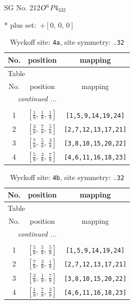 \documentclass[fleqn,8pt]{jsarticle}
\begin{document}
\setcounter{MaxMatrixCols}{32}

\renewcommand{\tablename}{Table~}
\renewcommand{\figurename}{Figure~}
\begin{center}
\LARGE
SG No. 212\quad$O_{\rm }^{6}$\quad$P4_332$\quad[ cubic ]
\end{center}
* plus set:\,\,\,$+\left[ 0,\, 0,\, 0 \right]$
\renewcommand{\arraystretch}{1.2}
\begin{longtable}{ccc}
\caption{Wyckoff site: {\tt 4a}, site symmetry: {\tt .32}}
 \\
 \hline \hline
No. & position & mapping \\ \hline \endfirsthead

\multicolumn{2}{l}{\tablename\ \thetable{}} \\
 \hline \hline
No. & position & mapping \\ \hline \endhead

 \hline \hline
\multicolumn{2}{r}{\footnotesize\it continued ...} \\ \endfoot

 \hline \hline
\multicolumn{2}{r}{} \\ \endlastfoot

1 & $\left[ \frac{1}{8},\, \frac{1}{8},\, \frac{1}{8} \right]$ & {\tt [1,5,9,14,19,24]} \\ \hline
2 & $\left[ \frac{3}{8},\, \frac{7}{8},\, \frac{5}{8} \right]$ & {\tt [2,7,12,13,17,21]} \\ \hline
3 & $\left[ \frac{7}{8},\, \frac{5}{8},\, \frac{3}{8} \right]$ & {\tt [3,8,10,15,20,22]} \\ \hline
4 & $\left[ \frac{5}{8},\, \frac{3}{8},\, \frac{7}{8} \right]$ & {\tt [4,6,11,16,18,23]} \\
\end{longtable}
\renewcommand{\arraystretch}{1.2}
\begin{longtable}{ccc}
\caption{Wyckoff site: {\tt 4b}, site symmetry: {\tt .32}}
 \\
 \hline \hline
No. & position & mapping \\ \hline \endfirsthead

\multicolumn{2}{l}{\tablename\ \thetable{}} \\
 \hline \hline
No. & position & mapping \\ \hline \endhead

 \hline \hline
\multicolumn{2}{r}{\footnotesize\it continued ...} \\ \endfoot

 \hline \hline
\multicolumn{2}{r}{} \\ \endlastfoot

1 & $\left[ \frac{5}{8},\, \frac{5}{8},\, \frac{5}{8} \right]$ & {\tt [1,5,9,14,19,24]} \\ \hline
2 & $\left[ \frac{7}{8},\, \frac{3}{8},\, \frac{1}{8} \right]$ & {\tt [2,7,12,13,17,21]} \\ \hline
3 & $\left[ \frac{3}{8},\, \frac{1}{8},\, \frac{7}{8} \right]$ & {\tt [3,8,10,15,20,22]} \\ \hline
4 & $\left[ \frac{1}{8},\, \frac{7}{8},\, \frac{3}{8} \right]$ & {\tt [4,6,11,16,18,23]} \\
\end{longtable}
\end{document}
